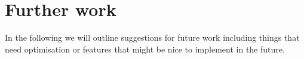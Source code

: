 
\section{Further work}

In the following we will outline suggestions for future work including things that need optimisation or features that might be nice to implement in the future. 

%


%
%
%


